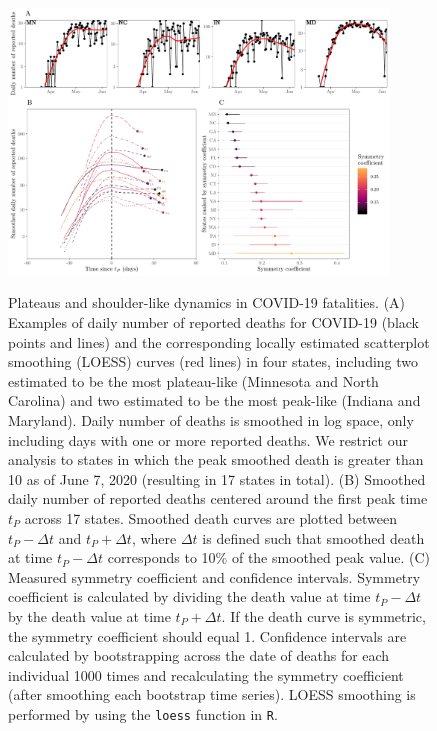 \begin{figure}[t!]
\begin{center}
\includegraphics[width=0.9\textwidth]{deaths/national_deaths_metric_boot.pdf}\\
\caption{Plateaus and shoulder-like dynamics in 
COVID-19 fatalities.  
(A) Examples of daily number of reported deaths for COVID-19 (black points and lines) and the corresponding locally estimated scatterplot smoothing (LOESS) curves (red lines) in four states, including
two estimated to be the most plateau-like (Minnesota and North Carolina)
and two estimated to be the most peak-like (Indiana and Maryland). 
Daily number of deaths is smoothed in log space, only including days with one or more reported deaths.
We restrict our analysis to states in which the peak smoothed death is greater than 10 as of June 7, 2020 (resulting in 17 states in total).
(B) Smoothed daily number of reported deaths  centered around the first peak time $t_P$ across 17 states.
Smoothed death curves are plotted between $t_P - \Delta t$ and $t_P + \Delta t$, where $\Delta t$ is defined such that smoothed death at time $t_P - \Delta t$ corresponds to 10\% of the smoothed peak value.
(C) Measured symmetry coefficient and confidence intervals.
Symmetry coefficient is calculated by dividing the death value at time $t_P - \Delta t$ by the death value at time $t_P + \Delta t$. If the death curve is symmetric, the symmetry coefficient should equal 1.
Confidence intervals are calculated by bootstrapping across the date of deaths for each individual 1000 times and recalculating the symmetry coefficient (after smoothing each bootstrap time series).
LOESS smoothing is performed by using the \texttt{loess} function in \texttt{R}.
\label{fig.plateaus_cases}}
\end{center}
\end{figure}

